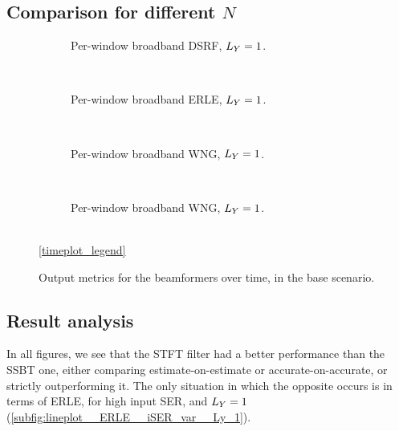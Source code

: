 \subsection{Comparison for different $N$}

\begin{figure}[!ht]
	\centering
	\begin{subfigure}{0.48\textwidth}
		\centering
		
		\caption{Per-window broadband DSRF, $\Ly = 1$.}
		\label{subfig:lineplot__DSRF__N_var__iSER_n15__Ly_1}
	\end{subfigure}\\[1em]
	\begin{subfigure}{0.48\textwidth}
		\centering
		
		\caption{Per-window broadband ERLE, $\Ly = 1$.}
		\label{subfig:lineplot__ERLE__N_var__iSER_n15__Ly_1}
	\end{subfigure}\\[1em]
	\begin{subfigure}{0.48\textwidth}
		\centering
		
		\caption{Per-window broadband WNG, $\Ly = 1$.}
		\label{subfig:lineplot__WNG__N_var__iSER_n15__Ly_1}
	\end{subfigure}\\[1em]
	\begin{subfigure}{0.48\textwidth}
		\centering
		
		\caption{Per-window broadband WNG, $\Ly = 1$.}
		\label{subfig:lineplot__DI__N_var__iSER_n15__Ly_1}
	\end{subfigure}\\[1.5em]
	\ref*{timeplot_legend}
	\caption{Output metrics for the beamformers over time, in the base scenario.}
	\label{fig:lineplot__N_var__iSER_n15__Ly_1}
\end{figure}


\subsection{Result analysis}

In all figures, we see that the STFT filter had a better performance than the SSBT one, either comparing estimate-on-estimate or accurate-on-accurate, or strictly outperforming it. The only situation in which the opposite occurs is in terms of ERLE, for high input SER, and $\Ly = 1$ (\cref{subfig:lineplot__ERLE__iSER_var__Ly_1}). 

